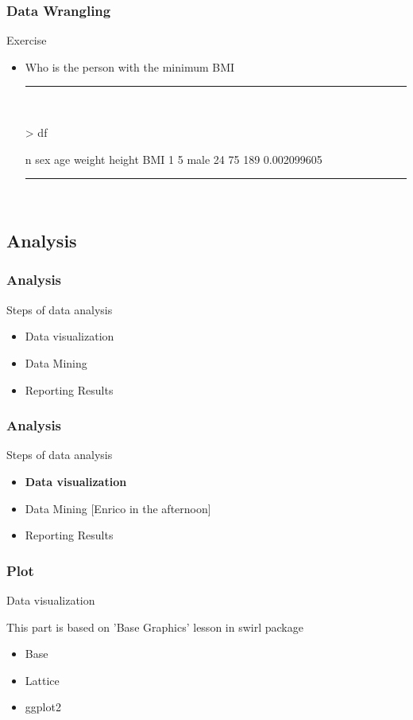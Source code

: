\documentclass{beamer}
\begin{document}
\begin{frame}[fragile]
	\frametitle{Data Wrangling}
	\centering \LARGE Exercise
	\begin{itemize}
		\small

		\item Who is the person with the minimum BMI
		\rule{\textwidth}{0.4pt}\\
\tiny
\setlength{\fancyvrbtopsep}{-1pt}
\setlength{\fancyvrbpartopsep}{-1pt}
\begin{Schunk}
\begin{Sinput}
> df %
\end{Sinput}
\begin{Soutput}
  n  sex age weight height         BMI
1 5 male  24     75    189 0.002099605
\end{Soutput}
\end{Schunk}
\rule{\textwidth}{0.4pt}\\
\small
	\end{itemize}
	\small
\end{frame}



\subsection{Analysis}
\begin{frame}[fragile]
	\frametitle{Analysis}
	\centering \Large Steps of data analysis
	\begin{itemize}
		\small
		\item Data visualization
		\item Data Mining
		\item Reporting Results
	\end{itemize}
\end{frame}


\begin{frame}[fragile]
	\frametitle{Analysis}
	\centering \Large Steps of data analysis
	\begin{itemize}
		\small
		\item \textbf{Data visualization}
		\item Data Mining [Enrico in the afternoon]
		\item Reporting Results
	\end{itemize}
\end{frame}


\begin{frame}[fragile]
	\frametitle{Plot}
	\centering \Large Data visualization

	\centering \footnotesize This part is based on 'Base Graphics' lesson in swirl package
	\begin{itemize}
		\small
		\item Base
		\item Lattice
		\item ggplot2
	\end{itemize}
\end{frame}
\end{document}
